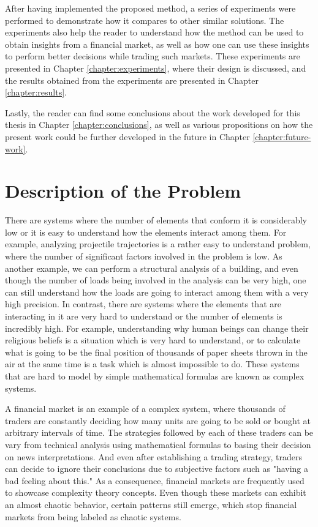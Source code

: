 After having implemented the proposed method, a series of experiments were performed to demonstrate how it compares to other similar solutions. The experiments also help the reader to understand how the method can be used to obtain insights from a financial market, as well as how one can use these insights to perform better decisions while trading such markets. These experiments are presented in Chapter \ref{chapter:experiments}, where their design is discussed, and the results obtained from the experiments are presented in Chapter \ref{chapter:results}.

Lastly, the reader can find some conclusions about the work developed for this thesis in Chapter \ref{chapter:conclusions}, as well as various propositions on how the present work could be further developed in the future in Chapter \ref{chapter:future-work}.

\section{Description of the Problem}
\label{section:description-of-the-problem}

There are systems where the number of elements that conform it is considerably low or it is easy to understand how the elements interact among them. For example, analyzing projectile trajectories is a rather easy to understand problem, where the number of significant factors involved in the problem is low. As another example, we can perform a structural analysis of a building, and even though the number of loads being involved in the analysis can be very high, one can still understand how the loads are going to interact among them with a very high precision. In contrast, there are systems where the elements that are interacting in it are very hard to understand or the number of elements is incredibly high. For example, understanding why human beings can change their religious beliefs is a situation which is very hard to understand, or to calculate what is going to be the final position of thousands of paper sheets thrown in the air at the same time is a task which is almost impossible to do. These systems that are hard to model by simple mathematical formulas are known as complex systems.

A financial market is an example of a complex system, where thousands of traders are constantly deciding how many units are going to be sold or bought at arbitrary intervals of time. The strategies followed by each of these traders can be vary from technical analysis using mathematical formulas to basing their decision on news interpretations. And even after establishing a trading strategy, traders can decide to ignore their conclusions due to subjective factors such as "having a bad feeling about this." As a consequence, financial markets are frequently used to showcase complexity theory concepts. Even though these markets can exhibit an almost chaotic behavior, certain patterns still emerge, which stop financial markets from being labeled as chaotic systems.

